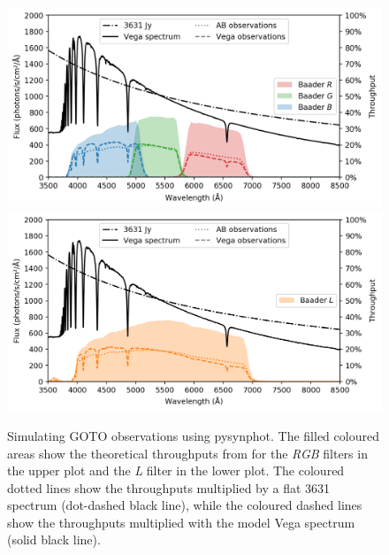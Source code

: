 \begin{colsection}
\newpage

\begin{figure}[p]
    \begin{center}
        \includegraphics[width=\linewidth]{images/throughput/synphot_RGB.png}
        \includegraphics[width=\linewidth]{images/throughput/synphot_L.png}
    \end{center}
    \caption[Simulating photometric observations using pysynphot]{
        Simulating GOTO observations using pysynphot. The filled coloured areas show the theoretical throughputs from  for the \textit{RGB} filters in the upper plot and the \textit{L} filter in the lower plot. The coloured dotted lines show the throughputs multiplied by a flat \SI{3631}{\jansky} spectrum (dot-dashed black line), while the coloured dashed lines show the throughputs multiplied with the model Vega spectrum (solid black line).
    }\label{fig:pysynphot}
\end{figure}

\clearpage
\newpage

\end{colsection}


